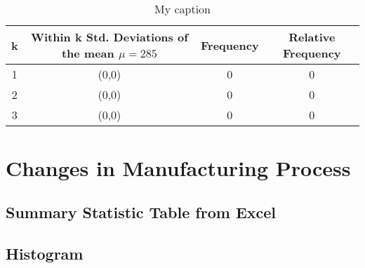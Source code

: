 \documentclass[letterpaper]{article}
\begin{document}
\subsection{}

\begin{table}[H]
 \centering
 \begin{tabular}{|c|c|c|c|}
  \hline
  \textbf{k} & \textbf{Within k Std. Deviations of the mean $\mu=285$} & \textbf{Frequency} & \textbf{Relative Frequency} \\ \hline
  1          & (0,0)                                                   & 0                  & 0                           \\ \hline
  2          & (0,0)                                                   & 0                  & 0                           \\ \hline
  3          & (0,0)                                                   & 0                  & 0                           \\ \hline
 \end{tabular}
 \caption{My caption}
 \label{my-label}
\end{table}

\subsection{} %

\subsection{} %

\section{Changes in Manufacturing Process} %

\subsection{Summary Statistic Table from Excel} %

\subsection{Histogram}
\end{document}
